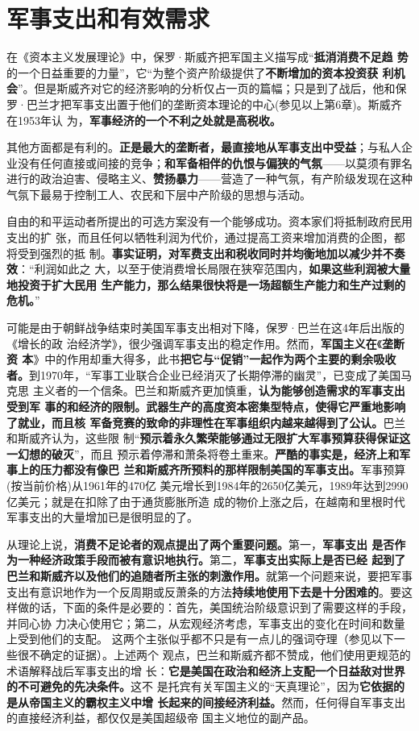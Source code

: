 \section{军事支出和有效需求}
在《资本主义发展理论》中，保罗·斯威齐把军国主义描写成“\textbf{抵消消费不足趋
  势}的一个日益重要的力量”，它“为整个资产阶级提供了\textbf{不断增加的资本投资获
  利机会}”。但是斯威齐对它的经济影响的分析仅占一页的篇幅；只是到了战后，他和保
罗·巴兰才把军事支出置于他们的垄断资本理论的中心(参见以上第6章)。斯威齐在1953年认
为，\textbf{军事经济的一个不利之处就是高税收。}

其他方面都是有利的。\textbf{正是最大的垄断者，最直接地从军事支出中受益}；与私人企
业没有任何直接或间接的竞争；\textbf{和军备相伴的仇恨与偏狭的气氛}——以莫须有罪名
进行的政治迫害、侵略主义、\textbf{赞扬暴力}——营造了一种气氛，有产阶级发现在这种
气氛下最易于控制工人、农民和下层中产阶级的思想与活动。

自由的和平运动者所提出的可选方案没有一个能够成功。资本家们将抵制政府民用支出的扩
张，而且任何以牺牲利润为代价，通过提高工资来增加消费的企图，都将受到强烈的抵
制。\textbf{事实证明，对军费支出和税收同时并均衡地加以减少并不奏效}：“利润如此之
大，以至于使消费增长局限在狭窄范围内，\textbf{如果这些利润被大量地投资于扩大民用
  生产能力，那么结果很快将是一场超额生产能力和生产过剩的危机。}”

可能是由于朝鲜战争结束时美国军事支出相对下降，保罗·巴兰在这4年后出版的《增长的政
治经济学》，很少强调军事支出的稳定作用。然而，\textbf{军国主义在}《\textbf{垄断资
  本}》中的作用却重大得多，此书\textbf{把它与“促销”一起作为两个主要的剩余吸收
  者。}到1970年，“军事工业联合企业已经消灭了长期停滞的幽灵”，已变成了美国马克思
主义者的一个信条。巴兰和斯威齐更加慎重，\textbf{认为能够创造需求的军事支出受到军
  事的和经济的限制。武器生产的高度资本密集型特点，使得它严重地影响了就业，而且核
  军备竞赛的致命的非理性在军事组织内越来越得到了公认。}巴兰和斯威齐认为，这些限
制“\textbf{预示着永久繁荣能够通过无限扩大军事预算获得保证这一幻想的破灭}”，而且
预示着停滞和萧条将卷土重来。\textbf{严酷的事实是，经济上和军事上的压力都没有像巴
  兰和斯威齐所预料的那样限制美国的军事支出。}军事预算(按当前价格)从1961年的470亿
美元增长到1984年的2650亿美元，1989年达到2990亿美元；就是在扣除了由于通货膨胀所造
成的物价上涨之后，在越南和里根时代军事支出的大量增加已是很明显的了。

从理论上说，\textbf{消费不足论者的观点提出了两个重要问题。}第一，\textbf{军事支出
  是否作为一种经济政策手段而被有意识地执行。}第二，\textbf{军事支出实际上是否已经
  起到了巴兰和斯威齐以及他们的追随者所主张的刺激作用。}就第一个问题来说，要把军事
支出有意识地作为一个反周期或反萧条的方法\textbf{持续地使用下去是十分困难的}。要这
样做的话，下面的条件是必要的：首先，美国统治阶级意识到了需要这样的手段，并同心协
力决心使用它；第二，从宏观经济考虑，军事支出的变化在时间和数量上受到他们的支配。
这两个主张似乎都不只是有一点儿的强词夺理（参见以下一些很不确定的证据）。上述两个
观点，巴兰和斯威齐都不赞成，他们使用更规范的术语解释战后军事支出的增
长：\textbf{它是美国在政治和经济上支配一个日益敌对世界的不可避免的先决条件。}这不
是托宾有关军国主义的“天真理论”，因为\textbf{它依据的是从帝国主义的霸权主义中增
  长起来的间接经济利益。}然而，任何得自军事支出的直接经济利益，都仅仅是美国超级帝
国主义地位的副产品。

